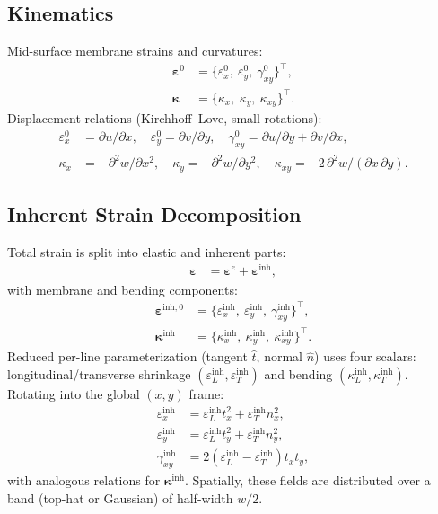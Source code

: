 \documentclass[11pt]{article}
\begin{document}
\subsection{Kinematics}
Mid-surface membrane strains and curvatures:
\begin{align}
  \boldsymbol\varepsilon^0 &= \{\varepsilon_x^0,\ \varepsilon_y^0,\ \gamma_{xy}^0\}^\top, \\
  \boldsymbol\kappa &= \{\kappa_x,\ \kappa_y,\ \kappa_{xy}\}^\top.
\end{align}
Displacement relations (Kirchhoff--Love, small rotations):
\begin{align}
  \varepsilon_x^0 &= \partial u / \partial x, \quad \varepsilon_y^0 = \partial v / \partial y, \quad \gamma_{xy}^0 = \partial u / \partial y + \partial v / \partial x, \\
  \kappa_x &= -\partial^2 w / \partial x^2, \quad \kappa_y = -\partial^2 w / \partial y^2, \quad \kappa_{xy} = -2\,\partial^2 w / (\partial x\,\partial y).
\end{align}

\subsection{Inherent Strain Decomposition}
Total strain is split into elastic and inherent parts:
\begin{align}
  \boldsymbol\varepsilon &= \boldsymbol\varepsilon^e + \boldsymbol\varepsilon^{\text{inh}},
\end{align}
with membrane and bending components:
\begin{align}
  \boldsymbol\varepsilon^{\text{inh},0} &= \{\varepsilon_x^{\text{inh}},\ \varepsilon_y^{\text{inh}},\ \gamma_{xy}^{\text{inh}}\}^\top, \\
  \boldsymbol\kappa^{\text{inh}} &= \{\kappa_x^{\text{inh}},\ \kappa_y^{\text{inh}},\ \kappa_{xy}^{\text{inh}}\}^\top.
\end{align}
Reduced per-line parameterization (tangent \(\hat t\), normal \(\hat n\)) uses four scalars: longitudinal/transverse shrinkage \((\varepsilon_L^{\text{inh}}, \varepsilon_T^{\text{inh}})\) and bending \((\kappa_L^{\text{inh}}, \kappa_T^{\text{inh}})\). Rotating into the global \((x,y)\) frame:
\begin{align}
  \varepsilon_x^{\text{inh}} &= \varepsilon_L^{\text{inh}} t_x^2 + \varepsilon_T^{\text{inh}} n_x^2, \\
  \varepsilon_y^{\text{inh}} &= \varepsilon_L^{\text{inh}} t_y^2 + \varepsilon_T^{\text{inh}} n_y^2, \\
  \gamma_{xy}^{\text{inh}} &= 2(\varepsilon_L^{\text{inh}} - \varepsilon_T^{\text{inh}}) t_x t_y,
\end{align}
with analogous relations for \(\boldsymbol\kappa^{\text{inh}}\). Spatially, these fields are distributed over a band (top-hat or Gaussian) of half-width \(w/2\).
\end{document}
